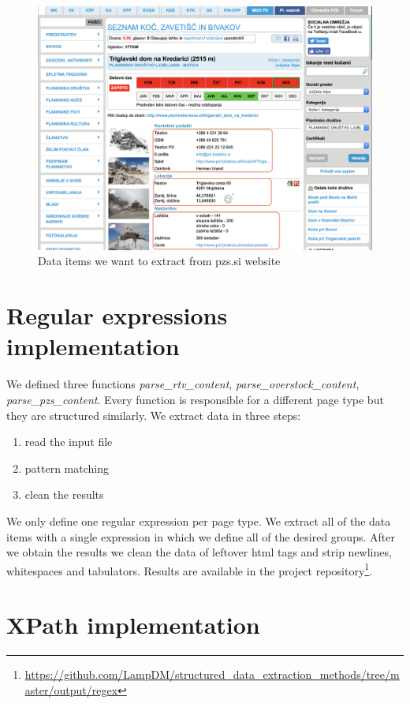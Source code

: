 \documentclass[runningheads]{llncs}
\begin{document}
\begin{figure}[H]
\begin{center}
\includegraphics[scale=0.4]{pzs.png}
\caption{Data items we want to extract from pzs.si website}
\label{fig:Slika1}
\end{center}
\end{figure}

\section{Regular expressions implementation}
We defined three functions {\em parse\_rtv\_content},  {\em parse\_overstock\_content},  {\em parse\_pzs\_content}. Every function is responsible for a different page type but they are structured similarly. We extract data in three steps:
\begin{enumerate}
   \item read the input file
   \item pattern matching
   \item clean the results
\end{enumerate}
We only define one regular expression per page type. We extract all of the data items with a single expression in which we define all of the desired groups. After we obtain the results we clean the data of leftover html tags and strip newlines, whitespaces and tabulators. Results are available in the project repository\footnote{\url{https://github.com/LampDM/structured\_data\_extraction\_methods/tree/master/output/regex}}.

\section{XPath implementation}
\end{document}
